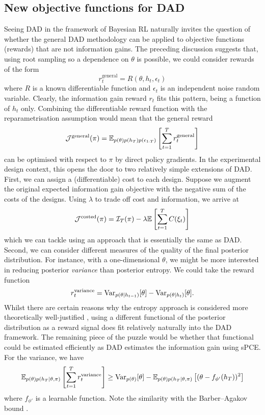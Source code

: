 \documentclass[a4paper, 10pt]{report}
\theoremstyle{plain}
\begin{document}
	\subsection{New objective functions for DAD}
	Seeing DAD in the framework of Bayesian RL naturally invites the question of whether the general DAD methodology can be applied to objective functions (rewards) that are not information gains.
	The preceding discussion suggests that, using root sampling so a dependence on $\theta$ is possible, we could consider rewards of the form
	\begin{equation}
	r^\text{general}_t = R(\theta,h_t,\epsilon_t)
	\end{equation}
	where $R$ is a known differentiable function and $\epsilon_t$ is an independent noise random variable.
	Clearly, the information gain reward $r_t$ fits this pattern, being a function of $h_t$ only.
	Combining the differentiable reward function with the reparametrisation assumption would mean that the general reward
	\begin{equation}
	\mathcal{J}^\text{general}(\pi) = \mathbb{E}_{p(\theta)p(h_T)p(\epsilon_{1:T})}\left[\sum_{t=1}^T r^\text{general}_t \right]
	\end{equation}
	can be optimised with respect to $\pi$ by direct policy gradients.
	In the experimental design context, this opens the door to two relatively simple extensions of DAD.
	First, we can assign a (differentiable) cost to each design. Suppose we augment the original expected information gain objective with the negative sum of the costs of the designs. Using $\lambda$ to trade off cost and information, we arrive at 
	\begin{equation}
	\mathcal{J}^\text{costed}(\pi) = \mathcal{I}_T(\pi) - \lambda \mathbb{E}\left[\sum_{t=1}^T C(\xi_t) \right]
	\end{equation}
	which we can tackle using an approach that is essentially the same as DAD.
	Second, we can consider different measures of the quality of the final posterior distribution.
	For instance, with a one-dimensional $\theta$, we might be more interested in reducing posterior \emph{variance} than posterior entropy.
	We could take the reward function
	\begin{equation}
	r^\text{variance}_t = \mathrm{Var}_{p(\theta|h_{t-1})}[\theta] - \mathrm{Var}_{p(\theta|h_{t})}[\theta].
	\end{equation}
	Whilst there are certain reasons why the entropy approach is considered more theoretically well-justified \citep{lindley1956}, using a different functional of the posterior distribution as a reward signal does fit relatively naturally into the DAD framework. 
	The remaining piece of the puzzle would be whether that functional could be estimated efficiently as DAD estimates the information gain using sPCE.
	For the variance, we have
	\begin{equation}
	\mathbb{E}_{p(\theta)p(h_T|\theta,\pi)}\left[ \sum_{t=1}^T r^\text{variance}_t \right] \ge \mathrm{Var}_{p(\theta)}[\theta] -  \mathbb{E}_{p(\theta)p(h_T|\theta,\pi)}\left[ (\theta - f_{\phi'}(h_T))^2 \right]
	\end{equation}
	where $f_{\phi'}$ is a learnable function. Note the similarity with the Barber--Agakov bound \citep{ba,foster2019variational,foster2020unified}.
	
\end{document}

